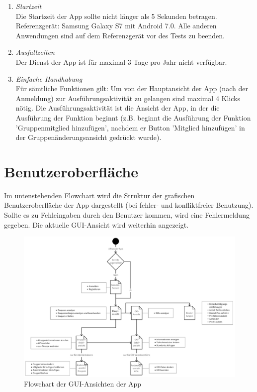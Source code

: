 \documentclass[parskip=full]{scrartcl}
\def\threedigits#1{%
  \ifnum#1<100 0\fi
  \ifnum#1<10 0\fi
  \number#1}
\begin{document}
\begin{enumerate}[label={\textbf{/NF\protect\threedigits{\theenumi}0/}}, leftmargin=*]
		\item \textit{Startzeit} \\
		Die Startzeit der App sollte nicht länger als 5 Sekunden betragen. \\
		Referenzgerät: Samsung Galaxy S7 mit Android 7.0. Alle anderen Anwendungen sind auf dem Referenzgerät vor des Tests zu beenden.
		
		\item \textit{Ausfallzeiten} \\
		Der Dienst der App ist für maximal 3 Tage pro Jahr nicht verfügbar.
		
		\item \textit{Einfache Handhabung}\\
		Für sämtliche Funktionen gilt: Um von der Hauptansicht der App (nach der Anmeldung) zur Ausführungsaktivität zu gelangen sind maximal 4 Klicks nötig. Die Ausführungsaktivität ist die Ansicht der App, in der die Ausführung der Funktion beginnt (z.B. beginnt die Ausführung der Funktion 'Gruppenmitglied hinzufügen', nachdem er Button 'Mitglied hinzufügen' in der Gruppenänderungsansicht gedrückt wurde).
		
\end{enumerate}

\newpage
\section{Benutzeroberfläche}

Im untenstehenden Flowchart wird die Struktur der grafischen Benutzeroberfläche der App dargestellt (bei fehler- und konfliktfreier Benutzung). Sollte es zu Fehleingaben durch den Benutzer kommen, wird eine Fehlermeldung gegeben. Die aktuelle GUI-Ansicht wird weiterhin angezeigt.

\begin{figure}[H]
	\vspace{1cm}
	\centering
	\includegraphics[width=\textwidth]{res/gui_flowchart.png}
	\caption{Flowchart der GUI-Ansichten der App}
	\vspace{1cm}
	\end{figure}
\end{document}
